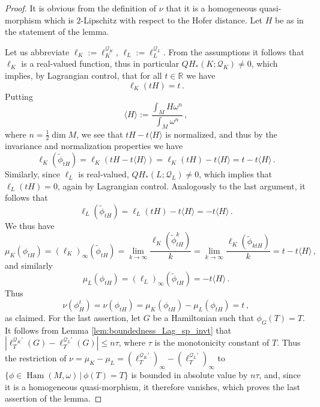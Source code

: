 \documentclass[11pt%
]{article}
\theoremstyle{definition}
\newcommand{\R}{{\mathbb{R}}}
\newcommand{\cQ}{{\mathcal{Q}}}
\newcommand{\wt}{\widetilde}
\DeclareMathOperator{\Ham}{Ham}
\DeclareMathOperator{\0}{\operatorname{\mathbf{0}}}
\begin{document}
\begin{proof}
  It is obvious from the definition of $\nu$ that it is a homogeneous quasi-morphism which is $2$-Lipschitz with respect to the Hofer distance. Let $H$ be as in the statement of the lemma.

  Let us abbreviate $\ell_K:=\ell^{\cQ_K}_K$, $\ell_L:=\ell^{\cQ_L}_L$. From the assumptions it follows that $\ell_K$ is a real-valued function, thus in particular $QH_*(K;\cQ_K)\neq 0$, which implies, by Lagrangian control, that for all $t \in \R$ we have
  $$\ell_K(tH) = t\,.$$
  Putting
  $$\langle H \rangle :=\frac{\int_M H\omega^n}{\int_M\omega^n}\,,$$
  where $n=\frac12\dim M$, we see that $tH-t\langle H\rangle$ is normalized, and thus by the invariance and normalization properties we have
  $$\ell_K(\wt\phi_{tH})=\ell_K(tH-t\langle H\rangle) = \ell_K(tH) - t\langle H\rangle = t-t\langle H \rangle\,.$$
  Similarly, since $\ell_L$ is real-valued, $QH_*(L;\cQ_L)\neq 0$, which implies that $\ell_L(tH) = 0$, again by Lagrangian control. Analogously to the last argument, it follows that
  $$\ell_L(\wt\phi_{tH}) = \ell_L(tH) - t\langle H\rangle = -t\langle H\rangle\,.$$
  We thus have
  $$\mu_K(\phi_{tH})=(\ell_K)_\infty(\wt\phi_{tH})=\lim_{k\to\infty}\frac{\ell_K(\wt\phi_{tH}^k)}{k}=\lim_{k\to\infty}\frac{\ell_K(\wt\phi_{ktH})}{k} = t-t\langle H\rangle\,,$$
  and similarly
  $$\mu_L(\phi_{tH})=(\ell_L)_\infty(\wt\phi_{tH})=-t\langle H\rangle\,.$$
  Thus
  $$\nu(\phi^t_H)=\nu(\phi_{tH}) = \mu_K(\phi_{tH}) - \mu_L(\phi_{tH}) = t\,,$$
  as claimed.
  For the last assertion, let $G$ be a Hamiltonian such that $\phi_G(T)=T$. It follows from Lemma \ref{lem:boundedness_Lag_sp_invt} that $|\ell^{\cQ_K'}_T(G) - \ell^{\cQ_L'}_T(G)| \leq n\tau$, where $\tau$ is the monotonicity constant of $T$. Thus the restriction of $\nu=\mu_K-\mu_L = (\ell^{\cQ_K'}_T)_\infty-(\ell^{\cQ_L'}_T)_\infty$ to $\{\phi\in\Ham(M,\omega)\,|\,\phi(T)=T\}$ is bounded in absolute value by $n\tau$, and, since it is a homogeneous quasi-morphism, it therefore vanishes, which proves the last assertion of the lemma.
\end{proof}
\end{document}
